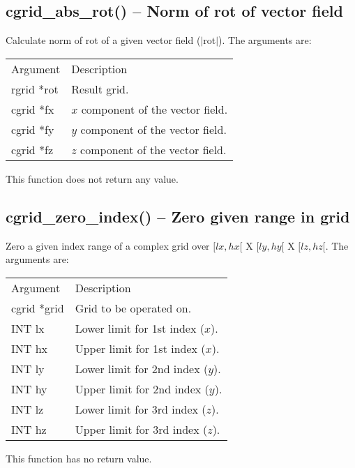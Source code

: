 \documentclass[12pt,letterpaper]{report}
\begin{document}
\subsection{cgrid\_abs\_rot() -- Norm of rot of vector field}

Calculate norm of rot of a given vector field ($|$rot$|$). The arguments are:
\begin{longtable}{p{} p{}}
Argument & Description\\
\cline{1-2}
rgrid *rot & Result grid.\\
cgrid *fx  & $x$ component of the vector field.\\
cgrid *fy  & $y$ component of the vector field.\\
cgrid *fz  & $z$ component of the vector field.\\
\end{longtable}
\noindent
This function does not return any value. 

\subsection{cgrid\_zero\_index() -- Zero given range in grid}

Zero a given index range of a complex grid over $[lx, hx[$ X $[ly, hy[$ X $[lz, hz[$. The arguments are:
\begin{longtable}{p{} p{}}
Argument & Description\\
\cline{1-2}
cgrid *grid & Grid to be operated on.\\                                                                           
INT lx & Lower limit for 1st index ($x$).\\                                                                                     
INT hx & Upper limit for 1st index ($x$).\\                                                                                     
INT ly & Lower limit for 2nd index ($y$).\\                                                                                     
INT hy & Upper limit for 2nd index ($y$).\\                                                                                     
INT lz & Lower limit for 3rd index ($z$).\\                                                                                      INT hz & Upper limit for 3rd index ($z$).\\        
\end{longtable}
\noindent
This function has no return value.
\end{document}
